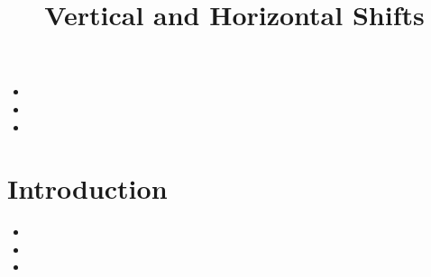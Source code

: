 \documentclass{ximera}
\author{}
\title{Vertical and Horizontal Shifts}
\begin{document}
\begin{abstract}
  
\end{abstract}
\maketitle



\begin{motivatingQuestions}\begin{itemize}
\item 
\item 
\item 
\end{itemize}\end{motivatingQuestions}



\section{Introduction}






\begin{summary}\begin{itemize}
\item 
\item 
\item
\end{itemize}\end{summary}
\end{document}
